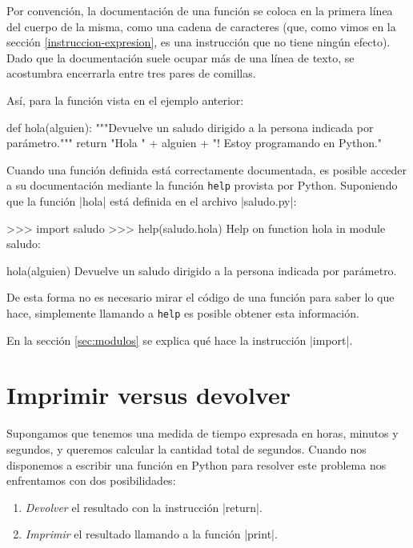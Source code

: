 Por convención, la documentación de una función se coloca en la primera línea
del cuerpo de la misma, como una cadena de caracteres (que, como vimos en la
sección \ref{instruccion-expresion}, es una instrucción que no tiene ningún
efecto). Dado que la documentación suele ocupar más de una línea de texto,
se acostumbra encerrarla entre tres pares de comillas.

Así, para la función vista en el ejemplo anterior:

\begin{codigo-python-sn}
def hola(alguien):
    """Devuelve un saludo dirigido a la persona indicada por parámetro."""
    return "Hola " + alguien + "! Estoy programando en Python."
\end{codigo-python-sn}

\begin{sabias_que}
Cuando una función definida está correctamente documentada, es posible acceder
a su documentación mediante la función \lstinline!help! provista por Python.
Suponiendo que la función |hola| está definida en el archivo |saludo.py|:

\begin{codigo-python-sn}
>>> import saludo
>>> help(saludo.hola)
Help on function hola in module saludo:

hola(alguien)
    Devuelve un saludo dirigido a la persona indicada por parámetro.
\end{codigo-python-sn}

De esta forma no es necesario mirar el código de una función para saber lo que
hace, simplemente llamando a \lstinline!help! es posible obtener esta
información.

En la sección \ref{sec:modulos} se explica qué hace la instrucción |import|.
\end{sabias_que}

\section{Imprimir versus devolver}

Supongamos que tenemos una medida de tiempo expresada en horas, minutos y
segundos, y queremos calcular la cantidad total de segundos. Cuando nos
disponemos a escribir una función en Python para resolver este problema nos
enfrentamos con dos posibilidades:

\begin{enumerate}
\item \emph{Devolver} el resultado con la instrucción |return|.
\item \emph{Imprimir} el resultado llamando a la función |print|.
\end{enumerate}

